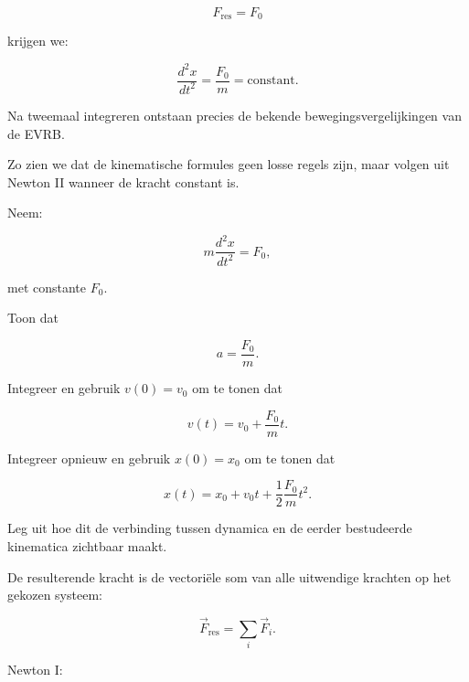 \documentclass{ximera}
\begin{document}
\[
F_{\mathrm{res}}=F_0
\]

krijgen we:

\[
\frac{d^2x}{dt^2}
=
\frac{F_0}{m}
=
\text{constant}.
\]

Na tweemaal integreren ontstaan precies de bekende
bewegingsvergelijkingen van de EVRB.

Zo zien we dat de kinematische formules geen losse regels zijn, maar
volgen uit Newton II wanneer de kracht constant is.


\begin{oefening}{\oefG}

Neem:

\[
m\frac{d^2x}{dt^2}=F_0,
\]

met constante $F_0$.

\begin{question}
Toon dat

\[
a=\frac{F_0}{m}.
\]

\end{question}

\begin{question}
Integreer en gebruik $v(0)=v_0$ om te tonen dat

\[
v(t)=v_0+\frac{F_0}{m}t.
\]

\end{question}

\begin{question}
Integreer opnieuw en gebruik $x(0)=x_0$ om te tonen dat

\[
x(t)
=
x_0+v_0t+\frac12\frac{F_0}{m}t^2.
\]

\end{question}

\begin{question}
Leg uit hoe dit de verbinding tussen dynamica en de eerder bestudeerde
kinematica zichtbaar maakt.
\end{question}

\end{oefening}




De resulterende kracht is de vectoriële som van alle uitwendige
krachten op het gekozen systeem:

\[
\boxed{
\vec F_{\mathrm{res}}=\sum_i\vec F_i.
}
\]

Newton I:
\end{document}
